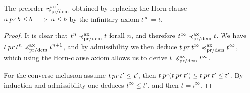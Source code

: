 \begin{proposition}
    The preorder $\preccurlyeq^{\text{ax}'}_{\text{pr/dem}}$ obtained 
    by replacing the Horn-clause $a \operatorname{\mathit{pr}} b \leq b \implies a \leq b$ by 
    the infinitary axiom $t^\infty = t$.
\end{proposition}

\begin{proof}
    It is clear that $t^n \preccurlyeq^{\text{ax}}_{\text{pr/dem}} t$ forall $n$,
    and therefore $t^\infty \preccurlyeq^{\text{ax}}_{\text{pr/dem}} t$. 
    We have $t \operatorname{\mathit{pr}} t^n \preccurlyeq^{\text{ax}}_{\text{pr/dem}} t^{n+1}$,
    and by admissibility we then deduce $t \operatorname{\mathit{pr}} t^\infty \preccurlyeq^{\text{ax}}_{\text{pr/dem}}
    t^\infty$, which using the Horn-clause axiom allows us to derive $t
    \preccurlyeq^{\text{ax}}_{\text{pr/dem}} t^\infty$.

    For the converse inclusion assume $t \operatorname{\mathit{pr}} t' \leq t'$,
    then $t \operatorname{\mathit{pr}} (t \operatorname{\mathit{pr}} t') \leq t \operatorname{\mathit{pr}} t' \leq t'$.
    By induction and admissibility one deduces $t^\infty \leq t'$,
    and then $t = t^\infty$.
\end{proof}
